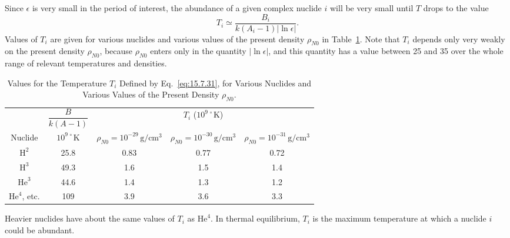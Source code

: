 Since \(\epsilon\) is very small in the period of interest, the abundance of
a given complex nuclide \(i\) will be very small until \(T\) drops to the
value
\begin{equation}
  T_i\simeq\frac{B_i}{k(A_i-1)\lvert\ln\epsilon\rvert}.
  \tag{15.7.31}\label{eq:15.7.31}
\end{equation}
Values of \(T_i\) are given for various nuclides and various values of the
present density \(\rho_{N0}\) in Table~\ref{tab:15.6}. Note that \(T_i\)
depends only very weakly on the present density \(\rho_{N0}\), because
\(\rho_{N0}\) enters only in the quantity \(\lvert\ln\epsilon\rvert\), and
this quantity has a value between 25 and 35 over the whole range of relevant
temperatures and densities.

\begingroup
\renewcommand{\thetable}{15.6}
\begin{table}[htbp]
  \centering
  \caption{Values for the Temperature \(T_i\) Defined by
  Eq.~\eqref{eq:15.7.31}, for Various Nuclides and Various Values of the
  Present Density \(\rho_{N0}\).}
  \label{tab:15.6}
  \small
  \setlength{\tabcolsep}{5pt}
  \begin{tabular}{@{}ccccc@{}}
    \toprule
    & \(\dfrac{B}{k(A-1)}\) &
    \multicolumn{3}{c}{\(T_i\) (\(10^{9\,\circ}\mathrm K\))} \\
    \cmidrule(lr){3-5}
    Nuclide &
    \(10^{9\,\circ}\mathrm K\) &
    \(\rho_{N0}=10^{-29}\,\mathrm{g/cm^3}\) &
    \(\rho_{N0}=10^{-30}\,\mathrm{g/cm^3}\) &
    \(\rho_{N0}=10^{-31}\,\mathrm{g/cm^3}\) \\
    \midrule
    \(\mathrm H^2\)          & 25.8 & 0.83 & 0.77 & 0.72 \\
    \(\mathrm H^3\)          & 49.3 & 1.6  & 1.5  & 1.4 \\
    \(\mathrm{He}^3\)        & 44.6 & 1.4  & 1.3  & 1.2 \\
    \(\mathrm{He}^4\), etc.  & 109  & 3.9  & 3.6  & 3.3 \\
    \bottomrule
  \end{tabular}

  \vspace{0.5em}
  \begin{minipage}{0.92\linewidth}
    \footnotesize
    Heavier nuclides have about the same values of \(T_i\) as
    \(\mathrm{He}^4\). In thermal equilibrium, \(T_i\) is the maximum
    temperature at which a nuclide \(i\) could be abundant.
  \end{minipage}
\end{table}
\endgroup

